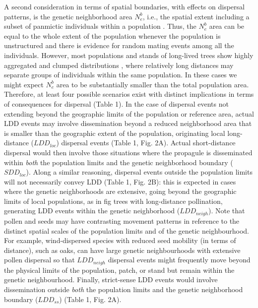 \documentclass[a4paper, 12pt]{article}
\begin{document}
\begin{linenumbers}
A second consideration in terms of spatial boundaries, with effects on dispersal patterns, is the genetic neighborhood area $N^b_e$, i.e., the spatial extent including a subset of panmictic individuals within a population \citep{Wright:1943aa,Wright:1946aa}. Thus, the $N^b_e$ area can be equal to the whole extent of the population whenever the population is unstructured and there is evidence for random mating events among all the individuals. However, most populations and stands of long-lived trees show highly aggregated and clumped distributions \citep{Seidler:2006hx}, where relatively long distances may separate groups of individuals within the same population. In these cases we might expect $N^b_e$ area to be substantially smaller than the total population area. Therefore, at least four possible scenarios exist with distinct implications in terms of consequences for dispersal (Table 1). In the case of dispersal events not extending beyond the geographic limits of the population or reference area, actual LDD events may involve dissemination beyond a reduced neighborhood area that is smaller than the geographic extent of the population, originating local long-distance ($LDD_{loc}$) dispersal events (Table 1, Fig. 2A). Actual short-distance dispersal would then involve those situations where the propagule is disseminated within \textit{both} the population limits and the genetic neighborhood boundary ($SDD_{loc}$). Along a similar reasoning, dispersal events outside the population limits will not necessarily convey LDD (Table 1, Fig. 2B): this is expected in cases where the genetic neighborhoods are extensive, going beyond the geographic limits of local populations, as in fig trees \citep{Nason:1998aa} with long-distance pollination, generating LDD events within the genetic neighborhood ($LDD_{neigh}$). Note that pollen and seeds may have contrasting movement patterns in reference to the distinct spatial scales of the population limits and of the genetic neighbourhood. For example, wind-dispersed species with reduced seed mobility (in terms of distance), such as oaks, can have large genetic neighbourhoods with extensive pollen dispersal \citep{Streiff99} \citep[but see, e.g.,][for fragmented stands]{Smouse:2001aa,Dutech:2005fk} so that $LDD_{neigh}$ dispersal events might frequently move beyond the physical limits of the population, patch, or stand but remain within the genetic neighbourhood. Finally, strict-sense LDD events would involve dissemination outside \textit{both} the population limits and the genetic neighborhood boundary ($LDD_{ss}$) (Table 1, Fig. 2A).


\end{linenumbers}
\end{document}
